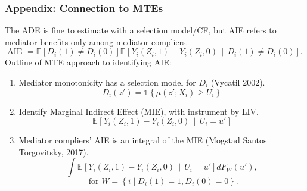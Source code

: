 \documentclass[dvipsnames]{beamer} %
\renewcommand{\vec}[1]{\boldsymbol{\mathit{#1}}}                           %
\newcommand{\E}[2][]{\mathbb{E}_{#1} \left[ #2 \right]}                    %
\newcommand{\Egiven}[3][]{\mathbb{E}_{#1} \left[ #2 \, \middle\vert \, #3 \right]} %
\newcommand{\indicator}[1]{\mathds{1}\left\{ #1 \right\}}                  %
\begin{document}
\begin{frame}[noframenumbering]
    \frametitle{Appendix: Connection to MTEs}
    \label{MTEs}
    The ADE is fine to estimate with a selection model/CF, but AIE refers to mediator benefits only among mediator compliers.
    \[ \text{AIE } =
    \E{D_i(1) \neq D_i(0)} 
    \Egiven{Y_i(Z_i, 1) - Y_i(Z_i, 0)}{D_i(1) \neq  D_i(0)}. \]
    Outline of MTE approach to identifying AIE:
    \begin{enumerate}
        \item Mediator monotonicity has a selection model for $D_i$ (Vycatil 2002).
        \[ D_i(z') = \indicator{ \mu(z'; \vec X_i) \geq U_i } \]
        \item Identify Marginal Indirect Effect (MIE), with instrument by LIV.
        \[ \Egiven{Y_i(Z_i, 1) - Y_i(Z_i, 0)}{U_i = u'} \]
        \item Mediator compliers' AIE is an integral of the MIE (Mogstad Santos Torgovitsky, 2017). 
        \[ \int \Egiven{Y_i(Z_i, 1) - Y_i(Z_i, 0)}{U_i = u'} dF_W(u'), \]
        \[ \text{ for } 
            W = \left\{ i \; \Big| \; D_i(1) = 1, D_i(0) = 0 \right\}. \]
    \end{enumerate}
\end{frame}
\end{document}
